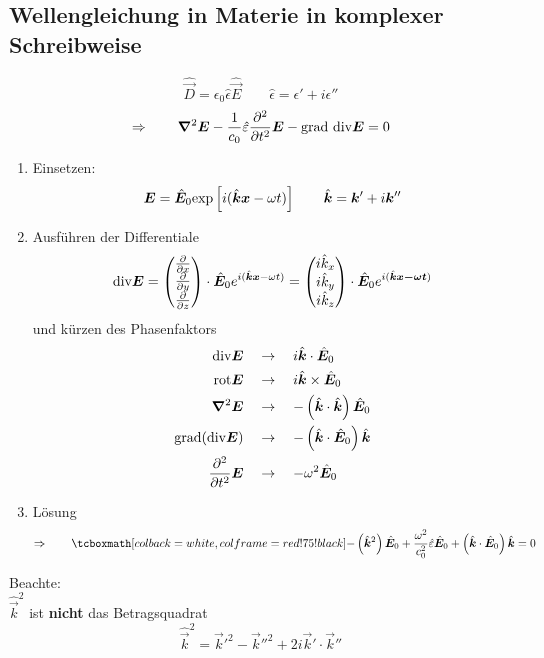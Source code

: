 \subsection{Wellengleichung in Materie in komplexer Schreibweise}
\begin{equation*}
\hat{\vec{D}} = \epsilon_0 \hat{\epsilon} \hat{\vec{E}} \qquad \hat{\epsilon} = \epsilon' + i \epsilon''
\end{equation*}
\begin{equation*}
\Rightarrow \qquad \bm{\nabla}^2 \bm{E} - \frac{1}{c_0} \hat{\varepsilon} \frac{\partial ^2}{\partial t^2} \bm{E} - \textrm{grad div} \bm{E} = 0
\end{equation*}
\begin{enumerate}[(1)]
	\item Einsetzen:
	\begin{equation*}
	\bm{E} = \hat{\bm{E}}_0 \textrm{exp} \left[i (\hat{\bm{k}} \bm{x} - \omega t)\right] \qquad \hat{\bm{k}} = \bm{k}' + i \bm{k}''
	\end{equation*}
	\item Ausführen der Differentiale
	\begin{equation*}
	\textrm{div} \bm{E} = \begin{pmatrix}
	\frac{\partial }{\partial x} \\ \frac{\partial }{\partial y} \\ \frac{\partial }{\partial z}
	\end{pmatrix} \cdot \hat{\bm{E}}_0 e^{i(\hat{\bm{k}} \bm{x} - \omega t)} = \begin{pmatrix}
	i \hat{k}_x \\ i \hat{k}_y \\ i \hat{k}_z
	\end{pmatrix} \cdot \hat{\bm{E}}_0 e^{i(\hat{\bm{k}} \bm{x - \omega t})} 
	\end{equation*}
	und kürzen des Phasenfaktors
	\begin{align*}
	\textrm{div} \bm{E} \quad &\rightarrow \quad i \hat{\bm{k}} \cdot \hat{\bm{E}}_0 \\
	\textrm{rot} \bm{E} \quad &\rightarrow \quad i \hat{\bm{k}} \times \hat{\bm{E}}_0 \\
	\bm{\nabla}^2 \bm{E} \quad &\rightarrow \quad - \left(\hat{\bm{k}} \cdot \hat{\bm{k}}\right) \hat{\bm{E}}_0 \\
	\textrm{grad} (\textrm{div} \bm{E}) \quad &\rightarrow \quad - \left(\hat{\bm{k}} \cdot \hat{\bm{E}}_0\right) \hat{\bm{k}}\\
	\frac{\partial ^2}{\partial t^2} \bm{E} \quad &\rightarrow \quad - \omega^2 \hat{\bm{E}}_0
	\end{align*}
	\item Lösung
	\begin{equation*}
	\Rightarrow \qquad \rmbox{- \left(\hat{\vec{k}}^2\right) \hat{\vec{E}}_0 + \frac{\omega^2}{c_0^2} \hat{\epsilon} \hat{\vec{E}}_0 + \left(\hat{\vec{k}} \cdot \hat{\vec{E}}_0\right) \hat{\vec{k}} = 0 }
	\end{equation*}
\end{enumerate}
Beachte:\\
$ \hat{\vec{k}}^2 $ ist \textbf{nicht} das Betragsquadrat
\begin{equation*}
\hat{\vec{k}}^2 = \vec{k}'^2 - \vec{k}''^2 + 2 i \vec{k}' \cdot \vec{k}''
\end{equation*}

